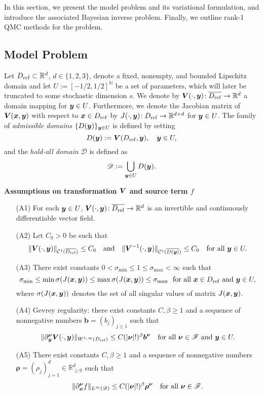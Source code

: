 \documentclass[graybox]{svmult}
\begin{document}
In this section, we present the model problem and its variational formulation, and introduce the associated Bayesian inverse problem. Finally, we outline rank-1 QMC methods for the problem.

\subsection{Model Problem}\label{subsec:model} 


Let $D_{\rm ref}\subset\mathbb R^d$, $d\in\{1,2,3\}$, denote a fixed, nonempty, and bounded Lipschitz domain and let $U:=[-1/2,1/2]^{\mathbb N}$ be a set of parameters, which will later be truncated to some stochastic dimension $s$. We denote by $\boldsymbol V(\cdot,{\boldsymbol{y}})\!:\overline{D_{\rm ref}}\to\mathbb R^d$ a domain mapping for ${\boldsymbol{y}}\in U$. Furthermore, we denote the Jacobian matrix of $\boldsymbol V({\boldsymbol{x}},{\boldsymbol{y}})$ with respect to ${\boldsymbol{x}}\in D_{\rm ref}$ by $J(\cdot,{\boldsymbol{y}})\!:D_{\rm ref}\to\mathbb R^{d\times d}$ for ${\boldsymbol{y}}\in U$. The family of {\em admissible domains} $\{D({\boldsymbol{y}})\}_{{\boldsymbol{y}}\in U}$ is defined by setting
$$
D({\boldsymbol{y}}):=\boldsymbol V(D_{\rm ref},{\boldsymbol{y}}),\quad {\boldsymbol{y}}\in U,
$$
and the {\em hold-all domain} $\mathscr D$ is defined as
$$
\mathscr D:=\bigcup_{{\boldsymbol{y}}\in U}D({\boldsymbol{y}}).
$$

\smallskip

\noindent \textbf{Assumptions on transformation ${\boldsymbol{V}}$ and source term $f$}
\begin{addmargin}[1.3em]{0em}
\begin{enumerate}
\item[(A1)] For each ${\boldsymbol{y}}\in U$, $\boldsymbol V(\cdot,{\boldsymbol{y}})\!:\overline{D_{\rm ref}}\to\mathbb R^d$ is an invertible and continuously differentiable vector field.\label{a1}
\item[(A2)] Let $C_0>0$ be such that\label{a2}
$$
\|\boldsymbol V(\cdot,{\boldsymbol{y}})\|_{\mathcal C^1(\overline{D_{\rm ref}})}\leq C_0\quad \text{and}\quad \|\boldsymbol V^{-1}(\cdot,{\boldsymbol{y}})\|_{\mathcal C^1(\overline{D({\boldsymbol{y}})})}\leq C_0\quad\text{for all}~{\boldsymbol{y}}\in U.
$$
\item[(A3)] There exist constants $0<\sigma_{\min}\leq 1\leq \sigma_{\max}<\infty$ such that\label{a3}
$$
\sigma_{\min}\leq \min\sigma(J({\boldsymbol{x}},{\boldsymbol{y}}))\leq \max \sigma(J({\boldsymbol{x}},{\boldsymbol{y}}))\leq \sigma_{\max}
~\text{ for all}~{\boldsymbol{x}}\in D_{\rm ref}~\text{and}~{\boldsymbol{y}}\in U,$$
where $\sigma(J({\boldsymbol{x}},{\boldsymbol{y}}))$ denotes the set of all singular values of matrix $J({\boldsymbol{x}},{\boldsymbol{y}})$.
\item[(A4)] Gevrey regularity: there exist constants $C,\beta\geq 1$ and a sequence of nonnegative numbers $\boldsymbol b=(b_j)_{j\geq 1}$ such that\label{a4}
$$
\|\partial_{\boldsymbol{y}}^{{\boldsymbol{\nu}}}\boldsymbol V(\cdot,{\boldsymbol{y}})\|_{W^{1,\infty}(D_{\rm ref})}\leq C(|{\boldsymbol{\nu}}|!)^{\beta}\boldsymbol b^{{\boldsymbol{\nu}}}\quad\text{for all}~{\boldsymbol{\nu}}\in\mathscr F~\text{and}~{\boldsymbol{y}}\in U.
$$
\item[(A5)] There exist constants $C,\beta\geq 1$ and a sequence of nonnegative numbers $\boldsymbol \rho=(\rho_j)_{j=1}^d \in \mathbb{R}_{\geq 0}^d$ such that\label{a5}
$$
\|\partial_{{\boldsymbol{x}}}^{{\boldsymbol{\nu}}} f\|_{L^\infty(\mathscr D)}\leq C(|{\boldsymbol{\nu}}|!)^{\beta}\boldsymbol \rho^{{\boldsymbol{\nu}}}\quad\text{for all}~{\boldsymbol{\nu}}\in\mathscr F.
$$
\end{enumerate}
\end{addmargin}
\end{document}
